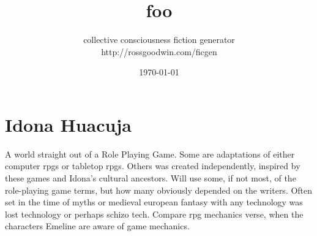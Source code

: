 \documentclass[12pt]{book}
\title{foo}
\author{collective consciousness fiction generator\\http://rossgoodwin.com/ficgen}
\date{\today}
\begin{document}
\maketitle



\chapter{Idona Huacuja}

A world straight out of a Role Playing Game. Some are adaptations of either computer rpgs or tabletop rpgs. Others was created independently, inspired by these games and Idona's cultural ancestors. Will use some, if not most, of the role-playing game terms, but how many obviously depended on the writers. Often set in the time of myths or medieval european fantasy with any technology was lost technology or perhaps schizo tech. Compare rpg mechanics verse, when the characters Emeline are aware of game mechanics.
\end{document}
